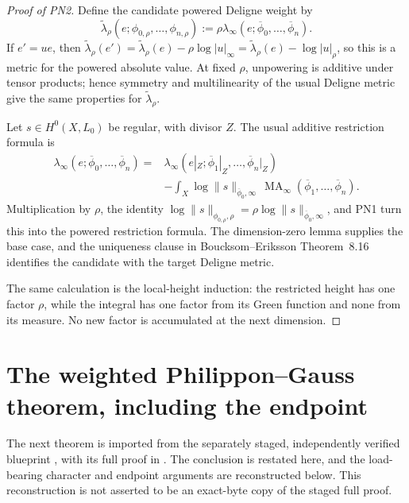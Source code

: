 \documentclass[11pt]{article}
\newcommand{\MA}{\operatorname{MA}}
\newcommand{\norm}[1]{\lVert#1\rVert}
\newcommand{\abs}[1]{\lvert#1\rvert}
\begin{document}
\medskip
\begin{proof}[Proof of PN2]
Define the candidate powered Deligne weight by
\[
 \widetilde\lambda_\rho
 (e;\phi_{0,\rho},\ldots,\phi_{n,\rho})
 :=\rho\lambda_\infty
 (e;\overline\phi_0,\ldots,\overline\phi_n).
\tag{2.1}\label{eq:PN2-candidate-r3}
\]
If $e'=ue$, then
$
\widetilde\lambda_\rho(e')=\widetilde\lambda_\rho(e)
-\rho\log\abs u_\infty
=\widetilde\lambda_\rho(e)-\log\abs u_\rho
$, so this is a metric for the powered absolute value.
At fixed $\rho$, unpowering is additive under tensor products; hence
symmetry and multilinearity of the usual Deligne metric give the same
properties for $\widetilde\lambda_\rho$.

Let $s\in H^0(X,L_0)$ be regular, with divisor $Z$.  The usual additive
restriction formula is
\begin{align*}
 \lambda_\infty(e;\overline\phi_0,\ldots,\overline\phi_n)
 ={}&\lambda_\infty(e|_Z;
       \overline\phi_1|_Z,\ldots,\overline\phi_n|_Z)\\
 &-\int_X\log\norm{s}_{\overline\phi_0,\infty}
       \,\MA_\infty(\overline\phi_1,\ldots,\overline\phi_n).
\end{align*}
Multiplication by $\rho$, the identity
$
 \log\norm{s}_{\phi_{0,\rho},\rho}
 =\rho\log\norm{s}_{\overline\phi_0,\infty}
$, and PN1 turn this into the powered restriction formula.  The
dimension-zero lemma supplies the base case, and the uniqueness clause in
Boucksom--Eriksson Theorem~8.16 identifies the candidate with the target
Deligne metric.

The same calculation is the local-height induction: the restricted height
has one factor $\rho$, while the integral has one factor from its Green
function and none from its measure.  No new factor is accumulated at the
next dimension.
\end{proof}

\section{The weighted Philippon--Gauss theorem, including the endpoint}

The next theorem is imported from the separately staged, independently
verified blueprint
, with its full proof in
.  The conclusion is restated
here, and the load-bearing character and endpoint arguments are reconstructed
below.  This reconstruction is not asserted to be an exact-byte copy of the
staged full proof.
\end{document}
